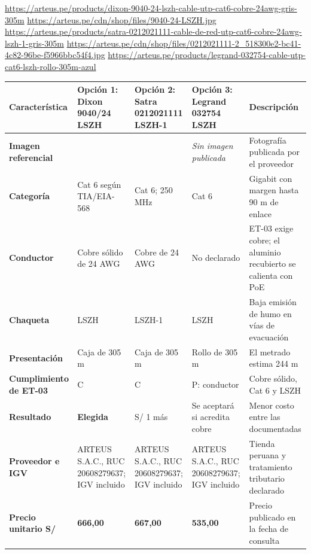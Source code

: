 \begin{landscape}
\urldef{\cotubz}\url{https://arteus.pe/products/dixon-9040-24-lszh-cable-utp-cat6-cobre-24awg-gris-305m}
\urldef{\cotuca}\url{https://arteus.pe/cdn/shop/files/9040-24-LSZH.jpg}
\urldef{\cotucb}\url{https://arteus.pe/products/satra-0212021111-cable-de-red-utp-cat6-cobre-24awg-lszh-1-gris-305m}
\urldef{\cotucc}\url{https://arteus.pe/cdn/shop/files/0212021111-2_518300e2-bc41-4c82-96be-f5966bbc54f4.jpg}
\urldef{\cotucd}\url{https://arteus.pe/products/legrand-032754-cable-utp-cat6-lszh-rollo-305m-azul}
\par\noindent\begin{minipage}{\linewidth}\formatofichas
{}\label{tab:cot-utp}
\begin{tabularx}{\linewidth}{@{}>{\raggedright\arraybackslash}p{3.0cm}YYY>{\raggedright\arraybackslash}p{4.4cm}@{}}
\toprule
\textbf{Característica} & \textbf{Opción 1: Dixon 9040/24 LSZH} & \textbf{Opción 2: Satra 0212021111 LSZH-1} & \textbf{Opción 3: Legrand 032754 LSZH} & \textbf{Descripción}\\\midrule
\textbf{Imagen referencial} &  &  & \emph{Sin imagen publicada} & Fotografía publicada por el proveedor\\
\textbf{Categoría} & Cat 6 según TIA/EIA-568 & Cat 6; 250 MHz & Cat 6 & Gigabit con margen hasta 90 m de enlace\\
\textbf{Conductor} & Cobre sólido de 24 AWG & Cobre de 24 AWG & No declarado & ET-03 exige cobre; el aluminio recubierto se calienta con PoE\\
\textbf{Chaqueta} & LSZH & LSZH-1 & LSZH & Baja emisión de humo en vías de evacuación\\
\textbf{Presentación} & Caja de 305 m & Caja de 305 m & Rollo de 305 m & El metrado estima 244 m\\
\textbf{Cumplimiento de ET-03} & C & C & P: conductor & Cobre sólido, Cat 6 y LSZH\\
\textbf{Resultado} & \textbf{Elegida} & S/ 1 más & Se aceptará si acredita cobre & Menor costo entre las documentadas\\
\textbf{Proveedor e IGV} & ARTEUS S.A.C., RUC 20608279637; IGV incluido & ARTEUS S.A.C., RUC 20608279637; IGV incluido & ARTEUS S.A.C., RUC 20608279637; IGV incluido & Tienda peruana y tratamiento tributario declarado\\
\textbf{Precio unitario S/} & \textbf{666,00} & \textbf{667,00} & \textbf{535,00} & Precio publicado en la fecha de consulta\\

\end{tabularx}
\end{minipage}
\end{landscape}

